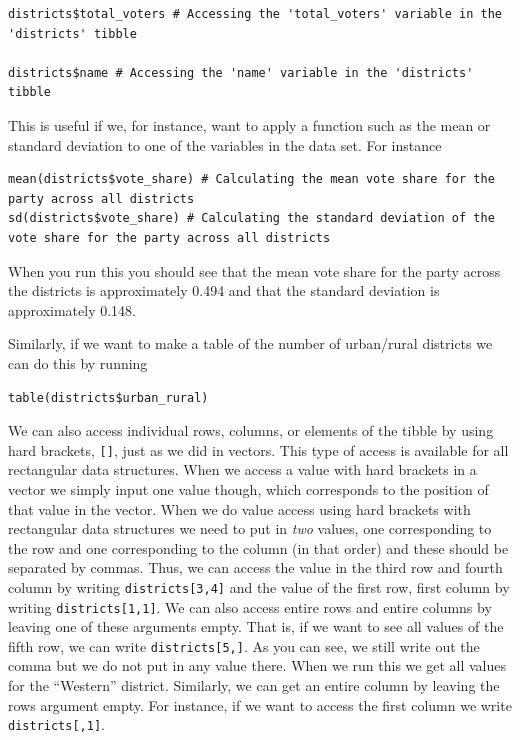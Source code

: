 \documentclass[
]{book}
\begin{document}
\begin{verbatim}
districts$total_voters # Accessing the 'total_voters' variable in the 'districts' tibble

districts$name # Accessing the 'name' variable in the 'districts' tibble
\end{verbatim}

This is useful if we, for instance, want to apply a function such as the mean or standard deviation to one of the variables in the data set. For instance

\begin{verbatim}
mean(districts$vote_share) # Calculating the mean vote share for the party across all districts
sd(districts$vote_share) # Calculating the standard deviation of the vote share for the party across all districts
\end{verbatim}

When you run this you should see that the mean vote share for the party across the districts is approximately 0.494 and that the standard deviation is approximately 0.148.

Similarly, if we want to make a table of the number of urban/rural districts we can do this by running

\begin{verbatim}
table(districts$urban_rural)
\end{verbatim}

We can also access individual rows, columns, or elements of the tibble by using hard brackets, \texttt{{[}{]}}, just as we did in vectors. This type of access is available for all rectangular data structures. When we access a value with hard brackets in a vector we simply input one value though, which corresponds to the position of that value in the vector. When we do value access using hard brackets with rectangular data structures we need to put in \emph{two} values, one corresponding to the row and one corresponding to the column (in that order) and these should be separated by commas. Thus, we can access the value in the third row and fourth column by writing \texttt{districts{[}3,4{]}} and the value of the first row, first column by writing \texttt{districts{[}1,1{]}}. We can also access entire rows and entire columns by leaving one of these arguments empty. That is, if we want to see all values of the fifth row, we can write \texttt{districts{[}5,{]}}. As you can see, we still write out the comma but we do not put in any value there. When we run this we get all values for the ``Western'' district. Similarly, we can get an entire column by leaving the rows argument empty. For instance, if we want to access the first column we write \texttt{districts{[},1{]}}.
\end{document}
